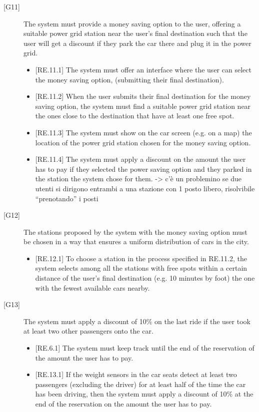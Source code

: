 \documentclass[english]{article}
\begin{document}
\begin{description}
\item[{[G11]}]{The system must provide a money saving option to the user, offering a suitable power grid station near the user’s final destination such that the user will get a discount if they park the car there and plug it in the power grid.
\begin{itemize}
	\item{[RE.11.1] The system must offer an interface where the user can select the money saving option, (submitting their final destination).}
	\item{[RE.11.2] When the user submits their final destination for the money saving option, the system must find a suitable power grid station near the ones close to the destination that have at least one free spot.}
	\item{[RE.11.3] The system must show on the car screen (e.g. on a map) the location of the power grid station chosen for the money saving option.}
	\item{[RE.11.4] The system must apply a discount on the amount the user has to pay if they selected the power saving option and they parked in the station the system chose for them.}
-> c’è un problemino se due utenti si dirigono entrambi a una stazione con 1 posto libero, risolvibile “prenotando” i posti
\end{itemize}
}

\item[{[G12]}]{The stations proposed by the system with the money saving option must be chosen in a way that ensures a uniform distribution of cars in the city.
\begin{itemize}
	\item{[RE.12.1] To choose a station in the process specified in RE.11.2, the system selects among all the stations with free spots within a certain distance of the user’s final destination (e.g. 10 minutes by foot) the one with the fewest available cars nearby.}
\end{itemize}
}

\item[{[G13]}]{The system must apply a discount of 10\% on the last ride if the user took at least two other passengers onto the car.
\begin{itemize}
	\item{[RE.6.1] The system must keep track until the end of the reservation of the amount the user has to pay.}
	\item{[RE.13.1] If the weight sensors in the car seats detect at least two passengers (excluding the driver) for at least half of the time the car has been driving, then the system must apply a discount of 10\% at the end of the reservation on the amount the user has to pay.}
\end{itemize}
}


\end{description}
\end{document}
